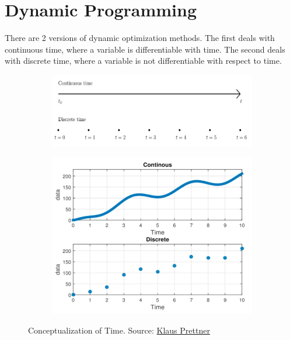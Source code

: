\documentclass[11pt,a4paper]{book}
\theoremstyle{definition}\newtheorem{definition}{Definition}
\theoremstyle{definition}\newtheorem{fact}{Fact}
\theoremstyle{definition}\newtheorem{remark}{Remark}
\theoremstyle{definition}\newtheorem{ex}{Ex.}
\theoremstyle{definition}\newtheorem{project}{Project}
\theoremstyle{definition}\newtheorem{problem}{Problem}
\theoremstyle{definition}\newtheorem{example}{Example}
\numberwithin{theorem}{section}
\numberwithin{corollary}{chapter}
\numberwithin{assumption}{chapter}
\numberwithin{definition}{chapter}
\numberwithin{prop}{chapter}
\numberwithin{notation}{chapter}
\numberwithin{problem}{chapter}
\numberwithin{example}{chapter}
\numberwithin{fact}{chapter}
\numberwithin{ex}{chapter}
\begin{document}
	
	\chapter{Dynamic Programming}
	There are 2 versions of dynamic optimization methods. The first deals with continuous time, where a variable is differentiable with time. The second deals with discrete time, where a variable is not differentiable with respect to time.
	
	\begin{figure}[h!]
\centering
\begin{subfigure}[b]{0.45\linewidth}
\includegraphics[width=\linewidth]{figs/concept1.png}
\end{subfigure}
\begin{subfigure}[b]{0.45\linewidth}
\includegraphics[width=\linewidth]{figs/concept2.png}
\end{subfigure}
\caption{Conceptualization of Time. Source: \href{https://www.youtube.com/watch?v=w9VM7is9cl8}{Klaus Prettner}}
\label{fig:concept}
\end{figure}
\end{document}
